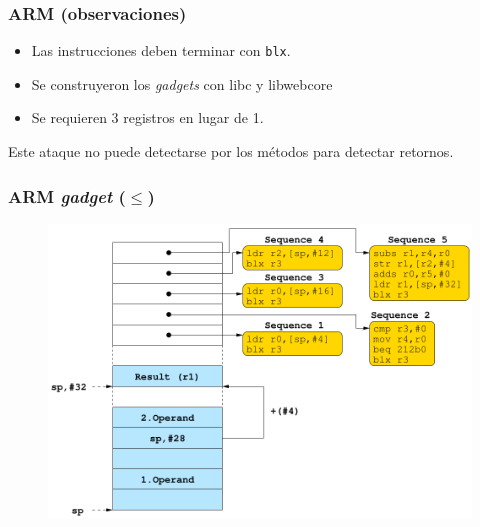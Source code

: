 \documentclass{beamer}
\newcommand { \vs } {\vspace{0.5cm}}
\begin{document}
\begin{frame}
    \frametitle{ARM (observaciones)}
    \begin{itemize}
        \item Las instrucciones deben terminar con \texttt{blx}.
        \item Se construyeron los \textit{gadgets} con libc y libwebcore
        \item Se requieren 3 registros en lugar de 1.
    \end{itemize}
    
    \vs 
    Este ataque no puede detectarse por los métodos para detectar retornos.
    
\end{frame}

\begin{frame}
    \frametitle{ARM \textit{gadget} ($\le$)}
    \begin{figure}
        \centering
        \includegraphics[scale=0.3]{gadgetARM.png}
    \end{figure}
\end{frame}
\end{document}
